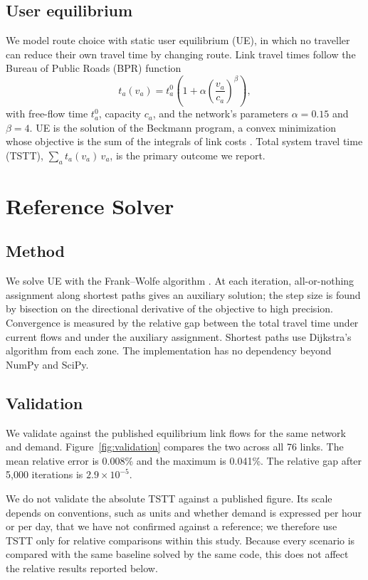 \documentclass[11pt,a4paper]{article}
\begin{document}
\subsection{User equilibrium}
We model route choice with static user equilibrium (UE), in which no traveller can reduce their own travel time by changing route. Link travel times follow the Bureau of Public Roads (BPR) function
\begin{equation}
t_a(v_a) = t^0_a \left(1 + \alpha \left(\frac{v_a}{c_a}\right)^{\beta}\right),
\end{equation}
with free-flow time $t^0_a$, capacity $c_a$, and the network's parameters $\alpha = 0.15$ and $\beta = 4$. UE is the solution of the Beckmann program, a convex minimization whose objective is the sum of the integrals of link costs \cite{beckmann1956}. Total system travel time (TSTT), $\sum_a t_a(v_a)\, v_a$, is the primary outcome we report.

\section{Reference Solver}
\subsection{Method}
We solve UE with the Frank--Wolfe algorithm \cite{frankwolfe1956}. At each iteration, all-or-nothing assignment along shortest paths gives an auxiliary solution; the step size is found by bisection on the directional derivative of the objective to high precision. Convergence is measured by the relative gap between the total travel time under current flows and under the auxiliary assignment. Shortest paths use Dijkstra's algorithm from each zone. The implementation has no dependency beyond NumPy and SciPy.

\subsection{Validation}
We validate against the published equilibrium link flows for the same network and demand. Figure~\ref{fig:validation} compares the two across all 76 links. The mean relative error is 0.008\% and the maximum is 0.041\%. The relative gap after 5{,}000 iterations is $2.9\times10^{-5}$.

We do not validate the absolute TSTT against a published figure. Its scale depends on conventions, such as units and whether demand is expressed per hour or per day, that we have not confirmed against a reference; we therefore use TSTT only for relative comparisons within this study. Because every scenario is compared with the same baseline solved by the same code, this does not affect the relative results reported below.
\end{document}
